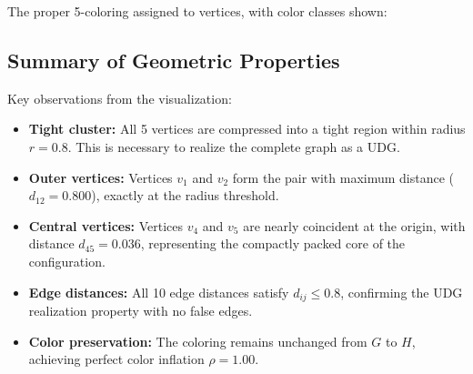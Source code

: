 \documentclass[11pt]{article}
\theoremstyle{definition}
\begin{document}
The proper 5-coloring assigned to vertices, with color classes shown:

\begin{center}
\end{center}

\subsection*{Summary of Geometric Properties}

Key observations from the visualization:

\begin{itemize}
  \item \textbf{Tight cluster:} All 5 vertices are compressed into a tight region within radius $r=0.8$. This is necessary to realize the complete graph as a UDG.
  
  \item \textbf{Outer vertices:} Vertices $v_1$ and $v_2$ form the pair with maximum distance ($d_{12}=0.800$), exactly at the radius threshold.
  
  \item \textbf{Central vertices:} Vertices $v_4$ and $v_5$ are nearly coincident at the origin, with distance $d_{45}=0.036$, representing the compactly packed core of the configuration.
  
  \item \textbf{Edge distances:} All 10 edge distances satisfy $d_{ij} \le 0.8$, confirming the UDG realization property with no false edges.
  
  \item \textbf{Color preservation:} The coloring remains unchanged from $G$ to $H$, achieving perfect color inflation $\rho = 1.00$.
\end{itemize}
\end{document}
